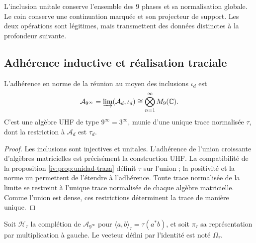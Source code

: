 L’inclusion unitale conserve l’ensemble des \(9\) phases et sa
normalisation globale. Le coin conserve une continuation marquée et
son projecteur de support. Les deux opérations sont légitimes, mais
transmettent des données distinctes à la profondeur suivante.

\subsection{Adhérence inductive et réalisation traciale}

\begin{theorem}
\label{iv:thm:uhf}
L'adhérence en norme de la réunion au moyen des inclusions \(\iota_d\) est
\[
 \mathcal A_{9^\infty}
 =\varinjlim(\mathcal A_d,\iota_d)
 \cong\bigotimes_{n=1}^{\infty}M_9(\mathbb C).
\]
C'est une algèbre UHF de type \(9^\infty=3^\infty\), munie d'une unique trace normalisée \(\tau\), dont la restriction à \(\mathcal A_d\) est \(\tau_d\).
\end{theorem}
\begin{proof}
Les inclusions sont injectives et unitales. L’adhérence de l’union
croissante d’algèbres matricielles est précisément la construction UHF.
La compatibilité de la proposition \ref{iv:prop:unidad-traza}
définit \(\tau\) sur l’union ; la positivité et la norme un permettent
de l’étendre à l’adhérence. Toute trace normalisée de la limite se restreint
à l’unique trace normalisée de chaque algèbre matricielle. Comme l’union
est dense, ces restrictions déterminent la trace de manière unique.
\end{proof}

Soit \(\mathcal H_\tau\) la complétion de
\(\mathcal A_{9^\infty}\) pour
\(\langle a,b\rangle_\tau=\tau(a^*b)\), et soit \(\pi_\tau\)
sa représentation par multiplication à gauche. Le vecteur défini
par l’identité est noté \(\Omega_\tau\).

